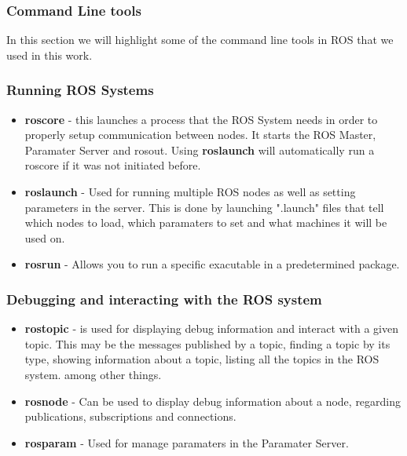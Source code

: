 \subsubsection{Command Line tools}
In this section we will highlight some of the command line tools in \ac{ROS} that we used in this work.
\subsubsection*{Running ROS Systems}
\begin{itemize}
    \item \textbf{roscore} - this launches a process that the ROS System needs in order to properly setup communication between nodes. It starts the \ac{ROS} Master, Paramater Server and rosout. Using \textbf{roslaunch} will automatically run a roscore if it was not initiated before. 
    \item \textbf{roslaunch} - Used for running multiple ROS nodes as well as setting parameters in the server. This is done by launching ".launch" files that tell which nodes to load, which paramaters to set and what machines it will be used on.
    \item \textbf{rosrun} - Allows you to run a specific exacutable in a predetermined package.
\end{itemize}
\subsubsection*{Debugging and interacting with the \ac{ROS} system}
\begin{itemize}
    \item \textbf{rostopic} - is used for displaying debug information and interact with a given topic. This may be the messages published by a topic, finding a topic by its type, showing information about a topic, listing all the topics in the \ac{ROS} system. among other things.
    \item \textbf{rosnode} - Can be used to display debug information about a node, regarding publications, subscriptions and connections.
    \item \textbf{rosparam} - Used for manage paramaters in the Paramater Server.

\end{itemize}





